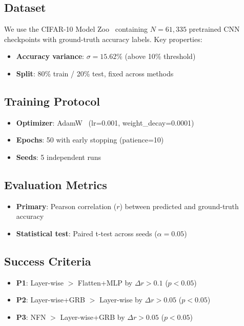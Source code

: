 \subsection{Dataset}

We use the CIFAR-10 Model Zoo~\cite{schurholt2022model} containing $N = 61{,}335$ pretrained CNN checkpoints with ground-truth accuracy labels. Key properties:
\begin{itemize}
    \item \textbf{Accuracy variance}: $\sigma = 15.62\%$ (above 10\% threshold)
    \item \textbf{Split}: 80\% train / 20\% test, fixed across methods
\end{itemize}

\subsection{Training Protocol}

\begin{itemize}
    \item \textbf{Optimizer}: AdamW~\cite{loshchilov2017adamw} (lr=0.001, weight\_decay=0.0001)
    \item \textbf{Epochs}: 50 with early stopping (patience=10)
    \item \textbf{Seeds}: 5 independent runs
\end{itemize}

\subsection{Evaluation Metrics}

\begin{itemize}
    \item \textbf{Primary}: Pearson correlation ($r$) between predicted and ground-truth accuracy
    \item \textbf{Statistical test}: Paired t-test across seeds ($\alpha = 0.05$)
\end{itemize}

\subsection{Success Criteria}

\begin{itemize}
    \item \textbf{P1}: Layer-wise $>$ Flatten+MLP by $\Delta r > 0.1$ ($p < 0.05$)
    \item \textbf{P2}: Layer-wise+GRB $>$ Layer-wise by $\Delta r > 0.05$ ($p < 0.05$)
    \item \textbf{P3}: NFN $>$ Layer-wise+GRB by $\Delta r > 0.05$ ($p < 0.05$)
\end{itemize}
